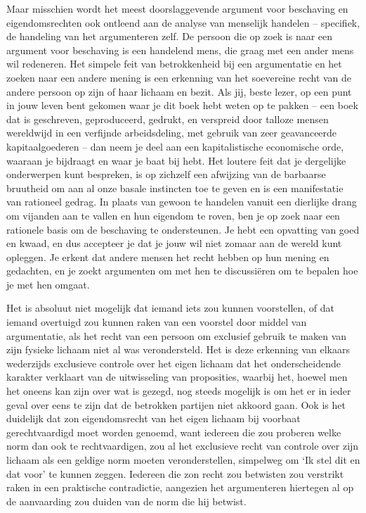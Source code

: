 Maar misschien wordt het meest doorslaggevende argument voor beschaving en eigendomsrechten ook ontleend aan de analyse van menselijk handelen -- specifiek, de handeling van het argumenteren zelf.\autocite{219} De persoon die op zoek is naar een argument voor beschaving is een handelend mens, die graag met een ander mens wil redeneren. Het simpele feit van betrokkenheid bij een argumentatie en het zoeken naar een andere mening is een erkenning van het soevereine recht van de andere persoon op zijn of haar lichaam en bezit. Als jij, beste lezer, op een punt in jouw leven bent gekomen waar je dit boek hebt weten op te pakken -- een boek dat is geschreven, geproduceerd, gedrukt, en verspreid door talloze mensen wereldwijd in een verfijnde arbeidsdeling, met gebruik van zeer geavanceerde kapitaalgoederen -- dan neem je deel aan een kapitalistische economische orde, waaraan je bijdraagt en waar je baat bij hebt. Het loutere feit dat je dergelijke onderwerpen kunt bespreken, is op zichzelf een afwijzing van de barbaarse bruutheid om aan al onze basale instincten toe te geven en is een manifestatie van rationeel gedrag. In plaats van gewoon te handelen vanuit een dierlijke drang om vijanden aan te vallen en hun eigendom te roven, ben je op zoek naar een rationele basis om de beschaving te ondersteunen. Je hebt een opvatting van goed en kwaad, en dus accepteer je dat je jouw wil niet zomaar aan de wereld kunt opleggen. Je erkent dat andere mensen het recht hebben op hun mening en gedachten, en je zoekt argumenten om met hen te discussiëren om te bepalen hoe je met hen omgaat.

\begin{blockquotebox}
    Het is absoluut niet mogelijk dat iemand iets zou kunnen voorstellen, of dat iemand overtuigd zou kunnen raken van een voorstel door middel van argumentatie, als het recht van een persoon om exclusief gebruik te maken van zijn fysieke lichaam niet al was verondersteld. Het is deze erkenning van elkaars wederzijds exclusieve controle over het eigen lichaam dat het onderscheidende karakter verklaart van de uitwisseling van proposities, waarbij het, hoewel men het oneens kan zijn over wat is gezegd, nog steeds mogelijk is om het er in ieder geval over eens te zijn dat de betrokken partijen niet akkoord gaan. Ook is het duidelijk dat zo\textquotesingle n eigendomsrecht van het eigen lichaam bij voorbaat gerechtvaardigd moet worden genoemd, want iedereen die zou proberen welke norm dan ook te rechtvaardigen, zou al het exclusieve recht van controle over zijn lichaam als een geldige norm moeten veronderstellen, simpelweg om `Ik stel dit en dat voor' te kunnen zeggen. Iedereen die zo\textquotesingle n recht zou betwisten zou verstrikt raken in een praktische contradictie, aangezien het argumenteren hiertegen al op de aanvaarding zou duiden van de norm die hij betwist.\footnotemark
\end{blockquotebox}


